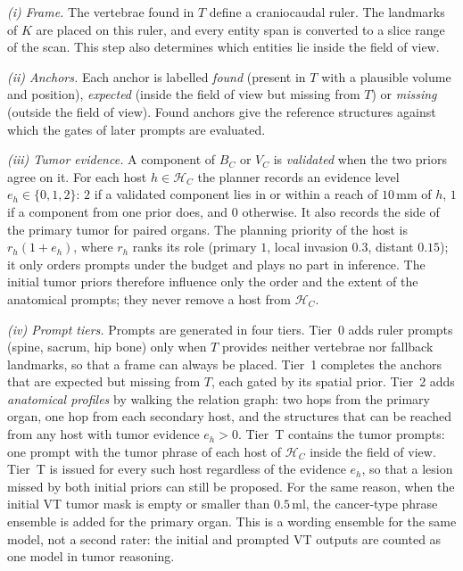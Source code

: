 \documentclass[fleqn,10pt]{olplainarticle}
\begin{document}
\emph{(i) Frame.} The vertebrae found in $T$ define a craniocaudal ruler. The landmarks of $K$ are placed on this ruler,
and every entity span is converted to a slice range of the scan. This step also determines which entities lie inside the
field of view.

\emph{(ii) Anchors.} Each anchor is labelled \emph{found} (present in $T$ with a plausible volume and position),
\emph{expected} (inside the field of view but missing from $T$) or \emph{missing} (outside the field of view). Found
anchors give the reference structures against which the gates of later prompts are evaluated.

\emph{(iii) Tumor evidence.} A component of $B_C$ or $V_C$ is \emph{validated} when the two priors agree on it. For each
host $h\in\mathcal{H}_C$ the planner records an evidence level $e_h\in\{0,1,2\}$: $2$ if a validated component lies in
or within a reach of $10$\,mm of $h$, $1$ if a component from one prior does, and $0$ otherwise. It also records the
side of the primary tumor for paired organs. The planning priority of the host is $r_h(1+e_h)$, where $r_h$ ranks its role
(primary $1$, local invasion $0.3$, distant $0.15$); it only orders prompts under the budget and plays no part in
inference. The initial tumor priors therefore influence only the order and the extent of the anatomical
prompts; they never remove a host from $\mathcal{H}_C$.

\emph{(iv) Prompt tiers.} Prompts are generated in four tiers. Tier~0 adds ruler prompts (spine, sacrum, hip bone) only
when $T$ provides neither vertebrae nor fallback landmarks, so that a frame can always be placed. Tier~1 completes the anchors that are expected but missing from $T$, each gated by its
spatial prior. Tier~2 adds \emph{anatomical profiles} by walking the relation graph: two hops from the primary organ,
one hop from each secondary host, and the structures that can be reached from any host with tumor evidence
$e_h>0$. Tier~T contains the tumor prompts: one prompt with the tumor phrase of each host of $\mathcal{H}_C$ inside the
field of view. Tier~T is issued for every such host regardless of the evidence $e_h$, so that a lesion missed by both
initial priors can still be proposed. For the same reason, when the initial VT tumor mask is empty or smaller than
$0.5$\,ml, the cancer-type phrase ensemble is added for the primary organ. This is a wording ensemble for the same
model, not a second rater: the initial and prompted VT outputs are counted as one model in tumor reasoning.
\end{document}
